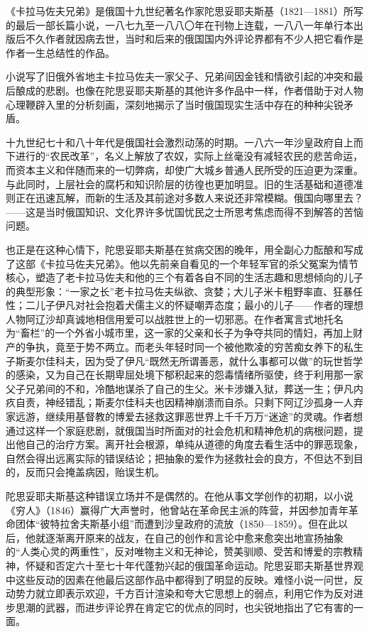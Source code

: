 \par 《卡拉马佐夫兄弟》是俄国十九世纪著名作家陀思妥耶夫斯基（1821—1881）所写的最后一部长篇小说，一八七九至一八八〇年在刊物上连载，一八八一年单行本出版后不久作者就因病去世，当时和后来的俄国国内外评论界都有不少人把它看作是作者一生总结性的作品。
\par 小说写了旧俄外省地主卡拉马佐夫一家父子、兄弟间因金钱和情欲引起的冲突和最后酿成的悲剧。也像在陀思妥耶夫斯基的其他许多作品中一样，作者借助于对人物心理鞭辟入里的分析刻画，深刻地揭示了当时俄国现实生活中存在的种种尖锐矛盾。
\par 十九世纪七十和八十年代是俄国社会激烈动荡的时期。一八六一年沙皇政府自上而下进行的“农民改革”，名义上解放了农奴，实际上丝毫没有减轻农民的悲苦命运，而资本主义和伴随而来的一切弊病，却使广大城乡普通人民所受的压迫更为深重。与此同时，上层社会的腐朽和知识阶层的彷徨也更加明显。旧的生活基础和道德准则正在迅速瓦解，而新的生活及其前途对多数人来说还非常模糊。俄国向哪里去？——这是当时俄国知识、文化界许多忧国忧民之士所思考焦虑而得不到解答的苦恼问题。
\par 也正是在这种心情下，陀思妥耶夫斯基在贫病交困的晚年，用全副心力酝酿和写成了这部《卡拉马佐夫兄弟》。他以先前亲自看见的一个年轻军官的杀父冤案为情节核心，塑造了老卡拉马佐夫和他的三个有着各自不同的生活志趣和思想倾向的儿子的典型形象：“一家之长”老卡拉马佐夫纵欲、贪婪；大儿子米卡粗野率直、狂暴任性；二儿子伊凡对社会抱着犬儒主义的怀疑嘲弄态度；最小的儿子——作者的理想人物阿辽沙却真诚地相信用爱可以战胜世上的一切邪恶。在作者寓言式地托名为“畜栏”的一个外省小城市里，这一家的父亲和长子为争夺共同的情妇，再加上财产的争执，竟至于势不两立。而老头年轻时同一个被他欺凌的穷苦痴女养下的私生子斯麦尔佳科夫，因为受了伊凡“既然无所谓善恶，就什么事都可以做”的玩世哲学的感染，又为自己在长期卑屈处境下郁积起来的怨毒情绪所驱使，终于利用那一家父子兄弟间的不和，冷酷地谋杀了自己的生父。米卡涉嫌入狱，葬送一生；伊凡内疚自责，神经错乱；斯麦尔佳科夫也因精神崩溃而自杀。只剩下阿辽沙孤身一人弃家远游，继续用基督教的博爱去拯救这罪恶世界上千千万万“迷途”的灵魂。作者想通过这样一个家庭悲剧，就俄国当时所面对的社会危机和精神危机的病根问题，提出他自己的治疗方案。离开社会根源，单纯从道德的角度去看生活中的罪恶现象，自然会得出远离实际的错误结论；把抽象的爱作为拯救社会的良方，不但达不到目的，反而只会掩盖病因，贻误生机。
\par 陀思妥耶夫斯基这种错误立场并不是偶然的。在他从事文学创作的初期，以小说《穷人》（1846）赢得广大声誉时，他曾站在革命民主派的阵营，并因参加青年革命团体“彼特拉舍夫斯基小组”而遭到沙皇政府的流放（1850—1859）。但在此以后，他就逐渐离开原来的战友，在自己的创作和言论中愈来愈突出地宣扬抽象的“人类心灵的两重性”，反对唯物主义和无神论，赞美驯顺、受苦和博爱的宗教精神，怀疑和否定六十至七十年代蓬勃兴起的俄国革命运动。陀思妥耶夫斯基世界观中这些反动的因素在他最后这部作品中都得到了明显的反映。难怪小说一问世，反动势力就立即表示欢迎，千方百计渲染和夸大它思想上的弱点，利用它作为反对进步思潮的武器，而进步评论界在肯定它的优点的同时，也尖锐地指出了它有害的一面。
